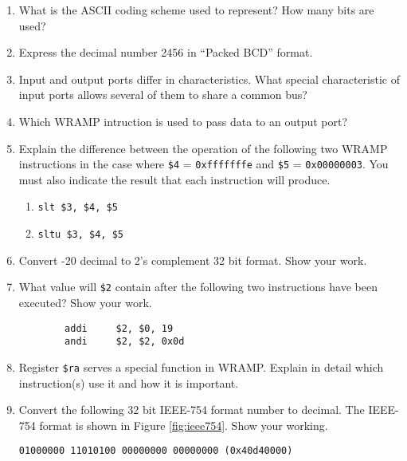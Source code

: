 \documentclass[a4paper,10pt]{article}
\begin{document}
\begin{enumerate}

\item What is the ASCII coding scheme used to represent? How many bits are used?

\item Express the decimal number 2456 in ``Packed BCD'' format.

\item Input and output ports differ in characteristics. What special characteristic
of input ports allows several of them to share a common bus?

\item Which WRAMP intruction is used to pass data to an output port?

\item Explain the difference between the operation of the following two WRAMP instructions
in the case where \texttt{\$4} = \texttt{0xfffffffe} and \texttt{\$5} = \texttt{0x00000003}.
You must also indicate the result that each instruction will produce.

\begin{enumerate}
  \item \texttt{slt \$3, \$4, \$5}
  \item \texttt{sltu \$3, \$4, \$5}
\end{enumerate}

\item Convert -20 decimal to 2's complement 32 bit format. Show your work.

\item What value will \texttt{\$2} contain after the following two instructions have been executed? Show your work.
\begin{verbatim}
        addi     $2, $0, 19
        andi     $2, $2, 0x0d
\end{verbatim}
\newpage
\item Register \texttt{\$ra} serves a special function in WRAMP. Explain in detail which instruction(s)
use it and how it is important.

\item Convert the following 32 bit IEEE-754 format number to decimal.
The IEEE-754 format is shown in Figure \ref{fig:ieee754}. Show your working.
\begin{center}
\texttt{01000000 11010100 00000000 00000000 (0x40d40000)}
\end{center}


\end{enumerate}
\end{document}
